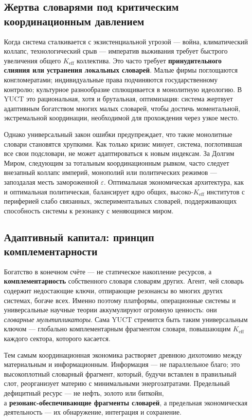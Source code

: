 \documentclass[12pt,a4paper]{article}
\begin{document}
	\subsection{Жертва словарями под критическим координационным давлением}
	
	Когда система сталкивается с экзистенциальной угрозой — война, климатический коллапс, технологический срыв — императив выживания требует быстрого увеличения общего \(K_{\mathrm{eff}}\) коллектива. Это часто требует \textbf{принудительного слияния или устранения локальных словарей}. Малые фирмы поглощаются конгломератами; индивидуальные права подчиняются государственному контролю; культурное разнообразие сплющивается в монолитную идеологию. В YUCT это рациональная, хотя и брутальная, оптимизация: система жертвует адаптивным богатством многих малых словарей, чтобы достичь моментальной, экстремальной координации, необходимой для прохождения через узкое место.
	
	Однако универсальный закон ошибки предупреждает, что такие монолитные словари становятся хрупкими. Как только кризис минует, система, поглотившая все свои подсловари, не может адаптироваться к новым индексам. За Долгим Миром, следующим за тотальным координационным рывком, часто следует внезапный коллапс империй, монополий или политических режимов — запоздалая месть замороженной \(\varepsilon\). Оптимальная экономическая архитектура, как и оптимальная политическая, балансирует ядро общих, высоко‑\(K_{\mathrm{eff}}\) институтов с периферией слабо связанных, экспериментальных словарей, поддерживающих способность системы к резонансу с меняющимся миром.
	
	\subsection{Адаптивный капитал: принцип комплементарности}
	
	Богатство в конечном счёте — не статическое накопление ресурсов, а \textbf{комплементарность} собственного словаря словарям других. Агент, чей словарь содержит недостающие ключи, отпирающие резонансы во многих других системах, богаче всех. Именно поэтому платформы, операционные системы и универсальные научные теории аккумулируют огромную ценность: они \emph{словарные мультипликаторы}. Сама YUCT стремится быть таким универсальным ключом — глобально комплементарным фрагментом словаря, повышающим \(K_{\mathrm{eff}}\) каждого сектора, которого касается.
	
	Тем самым координационная экономика растворяет древнюю дихотомию между материальным и информационным. Информация — не параллельное благо; это высокоплотный словарный фрагмент, который, будучи вставлен в правильный слот, реорганизует материю с минимальными энергозатратами. Предельный дефицитный ресурс — не нефть, золото или биткойн, \\ а \textbf{резонанс‑обеспечивающие фрагменты словарей}, а предельная экономическая деятельность — их обнаружение, интеграция и сохранение.
	
\end{document}
